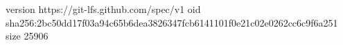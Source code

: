 version https://git-lfs.github.com/spec/v1
oid sha256:2bc50dd17f03a94c65b6dea3826347fcb6141101f0e21c02e0262cc6c9f6a251
size 25906
